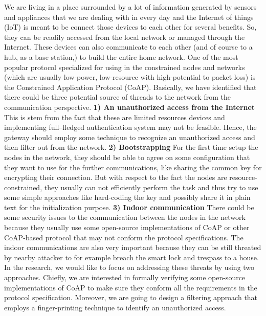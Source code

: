 \documentclass[10pt,a4paper]{letter}
\begin{document}
We are living in a place surrounded by a lot of information generated by sensors and appliances that we are dealing with in every day and the Internet of things (IoT) is meant to be connect those devices to each other for several benefits. So, they can be readily accessed from the local network or managed through the Internet. These devices can also communicate to each other (and of course to a hub, as a base station,) to build the entire home network. One of the most popular protocol specialized for using in the constrained nodes and networks (which are usually low-power, low-resource with high-potential to packet loss) is the Constrained Application Protocol (CoAP). Basically, we have identified that there could be three potential source of threads to the network from the communication perspective. \textbf{1) An unauthorized access from the Internet} This is stem from the fact that these are limited resources devices and implementing full–fledged authentication system may not be feasible. Hence, the gateway should employ some technique to recognize an unauthorized access and then filter out from the network. \textbf{2) Bootstrapping} For the first time  setup the nodes in the network, they should be able to agree on some configuration that they want to use for the further communications, like sharing the common key for encrypting their connection. But with respect to the fact the nodes are resource-constrained, they usually can not efficiently perform the task and thus try to use some simple approaches like hard-coding the key and possibly share it in plain text for the initialization purpose. \textbf{3) Indoor communication} There could be some security issues to the communication between the nodes in the network because they usually use some open-source implementations of CoAP or other CoAP-based protocol that may not conform the protocol specifications. The indoor communications are also very important because they can be still threated by nearby attacker to for example breach the smart lock and trespass to a house. 
\\
In the research, we would like to focus on addressing these threats by using two approaches. Chiefly, we are interested in formally verifying some open-source implementations of CoAP to make sure they conform all the requirements in the protocol specification. Moreover, we are going to design a filtering approach that employs a finger-printing technique to identify an unauthorized access.
\end{document}
